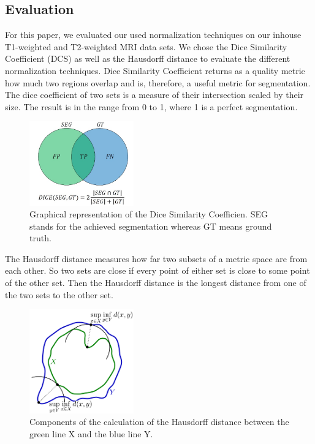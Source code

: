 \documentclass[conference]{IEEEtran}
\begin{document}
\subsection{Evaluation}
	For this paper, we evaluated our used normalization techniques on our inhouse T1-weighted and T2-weighted MRI data sets. 
	We chose the Dice Similarity Coefficient (DCS) as well as the Hausdorff distance to evaluate the different normalization techniques.
	Dice Similarity Coefficient returns as a quality metric how much two regions overlap and is, therefore, a useful metric for segmentation.
	The dice coefficient of two sets is a measure of their intersection scaled by their size. The result is in the range from 0 to 1, where 1 is a perfect segmentation. 
	
	\begin{figure}[h]
		\centering
		\includegraphics[width=0.4\textwidth]{diceGraphics.png}
		\caption{Graphical representation of the Dice Similarity Coefficien. SEG stands for the achieved segmentation whereas GT means ground truth.}
		\label{fig:e8}
	\end{figure}

	The Hausdorff distance measures how far two subsets of a metric space are from each other. So two sets are close if every point of either set is close 
	to some point of the other set. Then the Hausdorff distance is the longest distance from one of the two sets to the other set.
	\begin{figure}[h]
		\centering
		\includegraphics[width=0.4\textwidth]{haussdorfGraphics.png}
		\caption{Components of the calculation of the Hausdorff distance between the green line X and the blue line Y.}
		\label{fig:e8}
	\end{figure}
\end{document}
